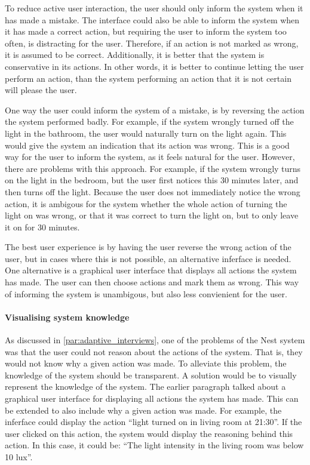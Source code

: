 To reduce active user interaction, the user should only inform the system when it has made a mistake. The interface could also be able to inform the system when it has made a correct action, but requiring the user to inform the system too often, is distracting for the user. Therefore, if an action is not marked as wrong, it is assumed to be correct. Additionally, it is better that the system is conservative in its actions. In other words, it is better to continue letting the user perform an action, than the system performing an action that it is not certain will please the user.

One way the user could inform the system of a mistake, is by reversing the action the system performed badly. For example, if the system wrongly turned off the light in the bathroom, the user would naturally turn on the light again. This would give the system an indication that its action was wrong. This is a good way for the user to inform the system, as it feels natural for the user. However, there are problems with this approach. For example, if the system wrongly turns on the light in the bedroom, but the user first notices this 30 minutes later, and then turns off the light. Because the user does not immediately notice the wrong action, it is ambigous for the system whether the whole action of turning the light on was wrong, or that it was correct to turn the light on, but to only leave it on for 30 minutes.

The best user experience is by having the user reverse the wrong action of the user, but in cases where this is not possible, an alternative inferface is needed. One alternative is a graphical user interface that displays all actions the system has made. The user can then choose actions and mark them as wrong. This way of informing the system is unambigous, but also less convienient for the user.

\paragraph{Visualising system knowledge}

As discussed in \cref{par:adaptive_interviews}, one of the problems of the Nest system was that the user could not reason about the actions of the system. That is, they would not know why a given action was made. To alleviate this problem, the knowledge of the system should be transparent. A solution would be to visually represent the knowledge of the system. The earlier paragraph talked about a graphical user interface for displaying all actions the system has made. This can be extended to also include why a given action was made. For example, the inferface could display the action \enquote{light turned on in living room at 21:30}. If the user clicked on this action, the system would display the reasoning behind this action. In this case, it could be: \enquote{The light intensity in the living room was below 10 lux}.
